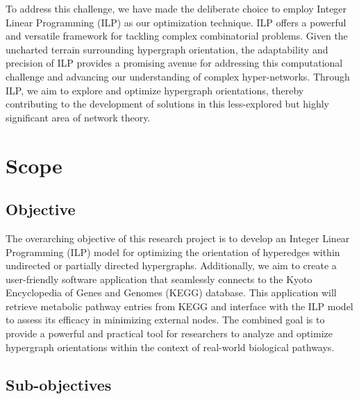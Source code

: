To address this challenge, we have made the deliberate choice to employ Integer Linear Programming (ILP) as our optimization technique. ILP offers a powerful and versatile framework for tackling complex combinatorial problems. Given the uncharted terrain surrounding hypergraph orientation, the adaptability and precision of ILP provides a promising avenue for addressing this computational challenge and advancing our understanding of complex hyper-networks. Through ILP, we aim to explore and optimize hypergraph orientations, thereby contributing to the development of solutions in this less-explored but highly significant area of network theory.

\section{Scope}

\subsection{Objective}

The overarching objective of this research project is to develop an Integer Linear Programming (ILP) model for optimizing the orientation of hyperedges within undirected or partially directed hypergraphs. Additionally, we aim to create a user-friendly software application that seamlessly connects to the Kyoto Encyclopedia of Genes and Genomes (KEGG) database. This application will retrieve metabolic pathway entries from KEGG and interface with the ILP model to assess its efficacy in minimizing external nodes. The combined goal is to provide a powerful and practical tool for researchers to analyze and optimize hypergraph orientations within the context of real-world biological pathways.

\subsection{Sub-objectives}

